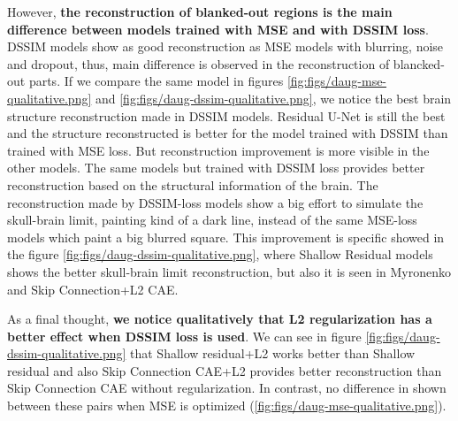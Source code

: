 However, \textbf{the reconstruction of blanked-out regions is the main difference between models trained with MSE and with DSSIM loss}. DSSIM models show as good reconstruction as MSE models with blurring, noise and dropout, thus, main difference is observed in the reconstruction of blancked-out parts. If we compare the same model in figures \ref{fig:figs/daug-mse-qualitative.png} and \ref{fig:figs/daug-dssim-qualitative.png}, we notice the best brain structure reconstruction made in DSSIM models. Residual U-Net is still the best and the structure reconstructed is better for the model trained with DSSIM than trained with MSE loss. But reconstruction improvement is more visible in the other models. The same models but trained with DSSIM loss provides better reconstruction based on the structural information of the brain. The reconstruction made by DSSIM-loss models show a big effort to simulate the skull-brain limit, painting kind of a dark line, instead of the same MSE-loss models which paint a big blurred square. This improvement is specific showed in the figure \ref{fig:figs/daug-dssim-qualitative.png}, where Shallow Residual models shows the better skull-brain limit reconstruction, but also it is seen in Myronenko and Skip Connection+L2 CAE. 

As a final thought, \textbf{we notice qualitatively that L2 regularization has a better effect when DSSIM loss is used}. We can see in figure \ref{fig:figs/daug-dssim-qualitative.png} that Shallow residual+L2 works better than Shallow residual and also Skip Connection CAE+L2 provides better reconstruction than Skip Connection CAE without regularization. In contrast, no difference in shown between these pairs when MSE is optimized (\ref{fig:figs/daug-mse-qualitative.png}).


